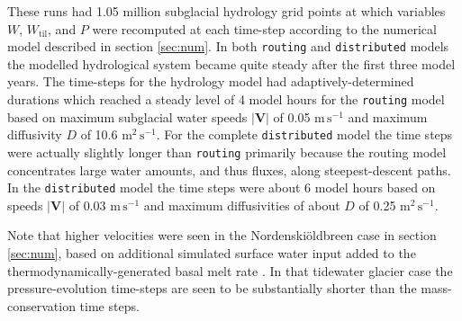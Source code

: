 \documentclass[gmd]{copernicus}   %
\newcommand{\text}{\textrm}
\newcommand\bV{\mathbf{V}}
\newcommand{\Wtil}{W_{\text{til}}}
\newcommand{\Nbreen}{Nordenski\"oldbreen\xspace}
\begin{document}
These runs had 1.05 million subglacial hydrology grid points at which variables $W$, $\Wtil$, and $P$ were recomputed at each time-step according to the numerical model described in section \ref{sec:num}.  In both \texttt{routing} and \texttt{distributed} models the modelled hydrological system became quite steady after the first three model years.  The time-steps for the hydrology model had adaptively-determined durations which reached a steady level of 4 model hours for the \texttt{routing} model based on maximum subglacial water speeds $|\bV|$ of 0.05 $\text{m}\,\text{s}^{-1}$ and maximum diffusivity $D$ of 10.6 $\text{m}^2\,\text{s}^{-1}$.  For the complete \texttt{distributed} model the time steps were actually slightly longer than \texttt{routing} primarily because the routing model concentrates large water amounts, and thus fluxes, along steepest-descent paths.  In the \texttt{distributed} model the time steps were about 6 model hours based on speeds $|\bV|$ of 0.03 $\text{m}\,\text{s}^{-1}$ and maximum diffusivities of about $D$ of 0.25 $\text{m}^2\,\text{s}^{-1}$.

Note that higher velocities were seen in the \Nbreen case in section \ref{sec:num}, based on additional simulated surface water input added to the thermodynamically-generated basal melt rate \citep{vanPeltthesis}.  In that tidewater glacier case the pressure-evolution time-steps are seen to be substantially shorter than the mass-conservation time steps.
\end{document}
